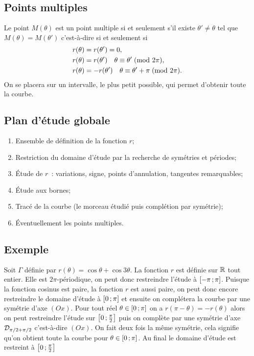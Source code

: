 \subsection{Points multiples}
Le point \(M(\theta)\) est un point multiple si et seulement s'il existe 
\(\theta' \neq \theta\) tel que \(M(\theta)=M(\theta')\) c'est-à-dire si et 
seulement si
\begin{align}
  r(\theta)&=r(\theta')=0, \\
  r(\theta)&=r(\theta') \quad \theta \equiv \theta'\!\pmod {2\pi},\\
  r(\theta)&=-r(\theta') \quad \theta \equiv \theta'+\pi\!\pmod {2\pi}.
\end{align}
On se placera sur un intervalle, le plus petit possible, qui permet d'obtenir 
toute la courbe.
\subsection{Plan d'étude globale}
\begin{enumerate}
  \item Ensemble de définition de la fonction \(r\);
  \item Restriction du domaine d'étude par la recherche de symétries et 
    périodes;
  \item Étude de \(r\)~: variations, signe, points d'annulation, tangentes 
    remarquables;
  \item Étude aux bornes;
  \item Tracé de la courbe (le morceau étudié puis complétion par symétrie);
  \item Éventuellement les points multiples.
\end{enumerate}

\subsection{Exemple}

Soit \(\Gamma\) définie par \(r(\theta)=\cos \theta + \cos 3\theta\). La 
fonction \(r\) est définie sur \(\mathbb{R}\) tout entier. Elle est 
\(2\pi\)-périodique, on peut donc restreindre l'étude à 
\(\left[ -\pi \, ;  \pi \right]\). Puisque la fonction cosinus est paire, la 
fonction \(r\) est aussi paire, on peut donc encore restreindre le domaine 
d'étude à \(\left[ 0 \, ;  \pi \right]\) et ensuite on complétera la courbe par une 
symétrie d'axe \((Ox)\). Pour tout réel \(\theta \in \left[ 0 \, ;  \pi \right]\) 
on a \(r(\pi-\theta)=-r(\theta)\) alors on peut restreindre l'étude sur 
\(\left[ 0 \, ;  \frac{\pi}{2} \right]\) puis on complète par une symétrie d'axe 
\(\mathcal{D}_{\pi/2 + \pi/2}\) c'est-à-dire \((Ox)\). On fait deux fois la même 
symétrie, cela signifie qu'on obtient toute la courbe pour \(\theta \in 
\left[ 0 \, ;  \pi \right]\). Au final le domaine d'étude est restreint à 
\(\left[ 0 \, ;  \frac{\pi}{2} \right]\)

